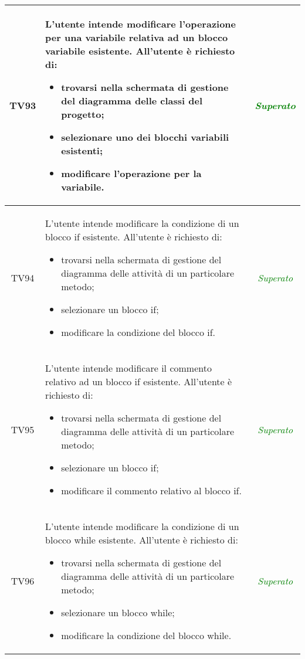 \begin{longtable}{|c|>{}m{8cm}|c|}
\hypertarget{TV4.20.4}{TV93} & L'utente intende modificare l'operazione per una variabile relativa ad un blocco variabile esistente.
All'utente è richiesto di:
\begin{itemize}
	\item trovarsi nella schermata di gestione del diagramma delle classi del progetto;
	\item selezionare uno dei blocchi variabili esistenti;
	\item modificare l'operazione per la variabile.
\end{itemize} & \textcolor{Green}{\textit{Superato}}\\ \hline

\hypertarget{TV4.22.1}{TV94} & L'utente intende modificare la condizione di un blocco if esistente.
All'utente è richiesto di:
\begin{itemize}
	\item trovarsi nella schermata di gestione del diagramma delle attività di un particolare metodo;
	\item selezionare un blocco if;
	\item modificare la condizione del blocco if.
\end{itemize} & \textcolor{Green}{\textit{Superato}}\\ \hline

\hypertarget{TV4.22.2}{TV95} & L'utente intende modificare il commento relativo ad un blocco if esistente.
All'utente è richiesto di:
\begin{itemize}
	\item trovarsi nella schermata di gestione del diagramma delle attività di un particolare metodo;
	\item selezionare un blocco if;
	\item modificare il commento relativo al blocco if.
\end{itemize} & \textcolor{Green}{\textit{Superato}}\\ \hline

\hypertarget{TV4.23.1}{TV96} & L'utente intende modificare la condizione di un blocco while esistente.
All'utente è richiesto di:
\begin{itemize}
\item trovarsi nella schermata di gestione del diagramma delle attività di un particolare metodo;
\item selezionare un blocco while;
\item modificare la condizione del blocco while.
\end{itemize} & \textcolor{Green}{\textit{Superato}}\\ \hline


\end{longtable}
